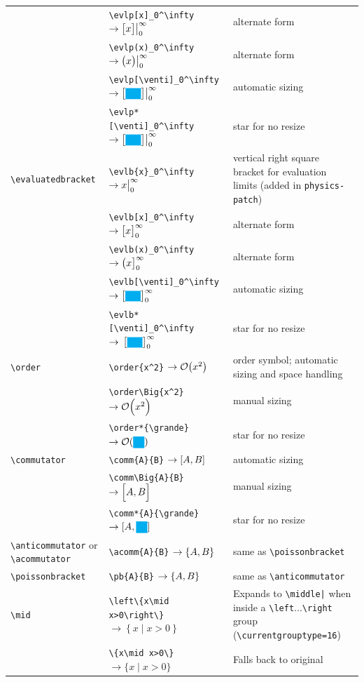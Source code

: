 \documentclass[a4paper,12pt]{article}
\begin{document}
\begin{longtable}[c]{|L{0.2\textwidth}|L{0.35\textwidth}|L{0.35\textwidth}|}
& \verb+\evlp[x]_0^\infty+ $\rightarrow \evlp[x]_0^\infty$ & alternate form \\
& \verb+\evlp(x)_0^\infty+ $\rightarrow \evlp(x)_0^\infty$ & alternate form \\
& \verb+\evlp[\venti]_0^\infty+ $\rightarrow \evlp[\venti]_0^\infty$ & automatic sizing\\
& \verb+\evlp*[\venti]_0^\infty+ $\rightarrow \evlp*[\venti]_0^\infty$ & star for no resize \\\hline
\verb|\evaluatedbracket| & \verb|\evlb{x}_0^\infty| $\rightarrow \eval{x}_0^\infty$ & vertical right square bracket for evaluation limits (added in \verb|physics-patch|) \\
& \verb+\evlb[x]_0^\infty+ $\rightarrow \evlb[x]_0^\infty$ & alternate form \\
& \verb+\evlb(x)_0^\infty+ $\rightarrow \evlb(x)_0^\infty$ & alternate form \\
& \verb+\evlb[\venti]_0^\infty+ $\rightarrow \evlb[\venti]_0^\infty$ & automatic sizing\\
& \verb+\evlb*[\venti]_0^\infty+ $\rightarrow \evlb*[\venti]_0^\infty$ & star for no resize \\\hline
\verb|\order| & \verb|\order{x^2}| $\rightarrow \order{x^2}$ & order symbol; automatic sizing and space handling \\
& \verb|\order\Big{x^2}| $\rightarrow \order\Big{x^2}$ & manual sizing \\
& \verb|\order*{\grande}| $\rightarrow \order*{\grande}$ & star for no resize \\\hline
\verb|\commutator| & \verb|\comm{A}{B}| $\rightarrow \comm{A}{B}$ & automatic sizing \\
& \verb|\comm\Big{A}{B}| $\rightarrow \comm\Big{A}{B}$ & manual sizing \\
& \verb|\comm*{A}{\grande}| $\rightarrow \comm*{A}{\grande}$ & star for no resize \\\hline
\verb|\anticommutator| or \verb|\acommutator| & \verb|\acomm{A}{B}| $\rightarrow \acomm{A}{B}$ & same as \verb|\poissonbracket| \\\hline
\verb|\poissonbracket| & \verb|\pb{A}{B}| $\rightarrow \pb{A}{B}$ & same as \verb|\anticommutator|\\\hline
\verb|\mid| & \verb|\left\{x\mid x>0\right\}| $\rightarrow \left\{x\mid x>0\right\}$ & Expands to \verb+\middle|+ when inside a \verb|\left|...\verb|\right| group (\verb|\currentgrouptype=16|) \\
& \verb|\{x\mid x>0\}| $\rightarrow \{x\mid x>0\}$ & Falls back to original \\\hline


\end{longtable}
\end{document}
